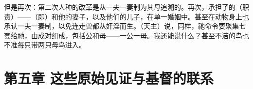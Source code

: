 但是再次：第二次人种的改革是从一夫一妻制为其母追溯的。再次，承担了的（职责）——（即）和他的妻子，以及他们的儿子，在单一婚姻中。甚至在动物身上也承认一夫一妻制，以免连走兽都从奸淫而生。（天主）说，同样，祂命令要聚集七套给祂，由成对组成，包括公和母——一公一母。我还能说什么？甚至不洁的鸟也不准每只带两只母鸟进入。\par


\section{第五章 这些原始见证与基督的联系}

